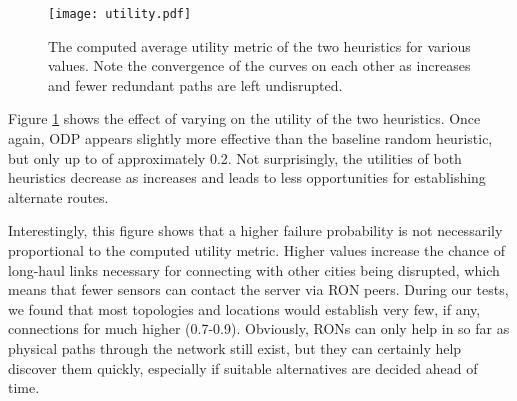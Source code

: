 \documentclass[conference]{IEEEtran}
\begin{document}


\begin{figure}
\centering
\texttt{[image: utility.pdf]}
\caption{The computed average utility metric of the two heuristics for various \pfail values. Note the convergence of the curves on each other as \pfail increases and fewer redundant paths are left undisrupted.}
\label{fig_utility}
\end{figure}

Figure \ref{fig_utility} shows the effect of varying \pfail on the utility of the two heuristics.
Once again, ODP appears slightly more effective than the baseline random heuristic, but only up to \pfail of approximately 0.2. %
Not surprisingly, the utilities of both heuristics decrease as \pfail increases and leads to less opportunities for establishing alternate routes.

Interestingly, this figure shows that a higher failure probability is not necessarily proportional to the computed utility metric.
Higher \pfail values increase the chance of long-haul links necessary for connecting with other cities being disrupted, which means that fewer sensors can contact the server via RON peers.
During our tests, we found that most topologies and locations would establish very few, if any, connections for much higher \pfail (0.7-0.9). %
Obviously, RONs can only help in so far as physical paths through the network still exist, but they can certainly help discover them quickly, especially if suitable alternatives are decided ahead of time.
\end{document}
